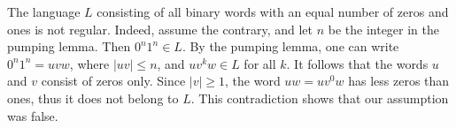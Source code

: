 \begin{exl}
The language $L$ consisting of all binary words with an equal number of zeros and ones is not regular.
Indeed, assume the contrary, and let $n$ be the integer in the pumping lemma.
Then $0^n1^n \in L$.
By the pumping lemma, one can write $0^n1^n = uvw$, where $|uv| \le n$, and $uv^kw \in L$ for all $k$.
It follows that the words $u$ and $v$ consist of zeros only.
Since $|v| \ge 1$, the word $uw = uv^0w$ has less zeros than ones, thus it does not belong to $L$.
This contradiction shows that our assumption was false.
\end{exl}